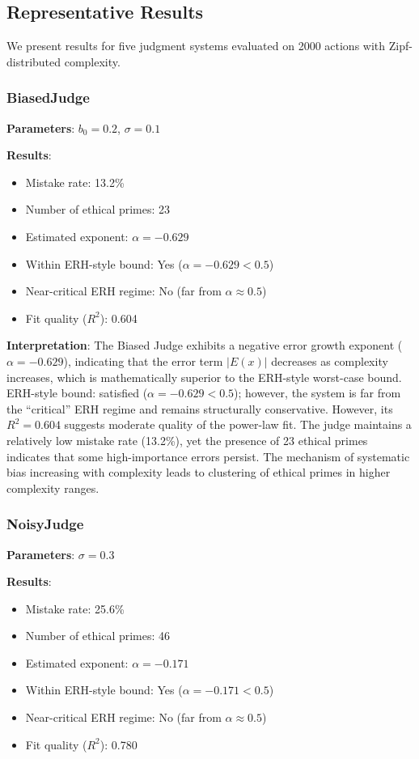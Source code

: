 \documentclass[12pt,a4paper]{article}
\theoremstyle{definition}
\theoremstyle{remark}
\begin{document}
\subsection{Representative Results}

We present results for five judgment systems evaluated on 2000 actions with Zipf-distributed complexity.

\subsubsection{BiasedJudge}

\textbf{Parameters}: $b_0 = 0.2$, $\sigma = 0.1$

\textbf{Results}:
\begin{itemize}
    \item Mistake rate: 13.2\%
    \item Number of ethical primes: 23
    \item Estimated exponent: $\alpha = -0.629$
    \item Within ERH-style bound: Yes ($\alpha = -0.629 < 0.5$)
    \item Near-critical ERH regime: No (far from $\alpha \approx 0.5$)
    \item Fit quality ($R^2$): 0.604
\end{itemize}

\textbf{Interpretation}: The Biased Judge exhibits a negative error growth exponent ($\alpha = -0.629$), indicating that the error term $|E(x)|$ decreases as complexity increases, which is mathematically superior to the ERH-style worst-case bound. ERH-style bound: satisfied ($\alpha = -0.629 < 0.5$); however, the system is far from the ``critical'' ERH regime and remains structurally conservative. However, its $R^2 = 0.604$ suggests moderate quality of the power-law fit. The judge maintains a relatively low mistake rate (13.2\%), yet the presence of 23 ethical primes indicates that some high-importance errors persist. The mechanism of systematic bias increasing with complexity leads to clustering of ethical primes in higher complexity ranges.

\subsubsection{NoisyJudge}

\textbf{Parameters}: $\sigma = 0.3$

\textbf{Results}:
\begin{itemize}
    \item Mistake rate: 25.6\%
    \item Number of ethical primes: 46
    \item Estimated exponent: $\alpha = -0.171$
    \item Within ERH-style bound: Yes ($\alpha = -0.171 < 0.5$)
    \item Near-critical ERH regime: No (far from $\alpha \approx 0.5$)
    \item Fit quality ($R^2$): 0.780
\end{itemize}
\end{document}
